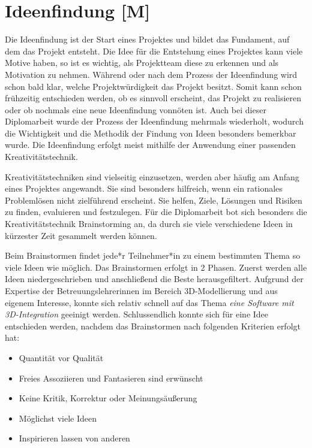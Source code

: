 
\section{Ideenfindung [M]}
Die Ideenfindung ist der Start eines Projektes und bildet das Fundament, auf dem das Projekt entsteht. Die Idee für die Entstehung eines Projektes kann viele Motive haben, so ist es wichtig, als Projektteam diese zu erkennen und als Motivation zu nehmen. Während oder nach dem Prozess der Ideenfindung wird schon bald klar, welche Projektwürdigkeit das Projekt besitzt. Somit kann schon frühzeitig entschieden werden, ob es sinnvoll erscheint, das Projekt zu realisieren oder ob nochmals eine neue Ideenfindung vonnöten ist. Auch bei dieser Diplomarbeit wurde der Prozess der Ideenfindung mehrmals wiederholt, wodurch die Wichtigkeit und die Methodik der Findung von Ideen besonders bemerkbar wurde. Die Ideenfindung erfolgt meist mithilfe der Anwendung einer passenden Kreativitätstechnik.

Kreativitätstechniken sind vielseitig einzusetzen, werden aber häufig am Anfang eines Projektes angewandt. Sie sind besonders hilfreich, wenn ein rationales Problemlösen nicht zielführend erscheint. Sie helfen, Ziele, Lösungen und Risiken zu finden, evaluieren und festzulegen. Für die Diplomarbeit bot sich besonders die Kreativitätstechnik Brainstorming an, da durch sie viele verschiedene Ideen in kürzester Zeit gesammelt werden können.

Beim Brainstormen findet jede*r Teilnehmer*in zu einem bestimmten Thema so viele Ideen wie möglich. Das Brainstormen erfolgt in 2 Phasen. Zuerst werden alle Ideen niedergeschrieben und anschließend die Beste herausgefiltert. Aufgrund der Expertise der Betreuungslehrerinnen im Bereich 3D-Modellierung und aus eigenem Interesse, konnte sich relativ schnell auf das Thema \emph{eine Software mit 3D-Integration} geeinigt werden. Schlussendlich konnte sich für eine Idee entschieden werden, nachdem das Brainstormen nach folgenden Kriterien erfolgt hat:
\begin{itemize}
    \item Quantität vor Qualität
    \item Freies Assoziieren und Fantasieren sind erwünscht
    \item Keine Kritik, Korrektur oder Meinungsäußerung
    \item Möglichst viele Ideen
    \item Inspirieren lassen von anderen
\end{itemize}
\cite{Ideenfindung}

